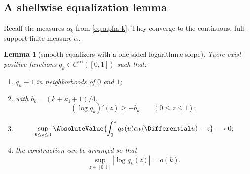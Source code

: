 \documentclass[11pt,oneside]{article}
\newtheorem{lemma}[theorem]{Lemma}
\theoremstyle{definition}
\theoremstyle{remark}
\begin{document}
\subsection{A shellwise equalization lemma}

Recall the measures \(\alpha_k\) from \eqref{eq:alpha-k}.  They converge to
the continuous, full-support finite measure \(\alpha\).

\begin{lemma}[smooth equalizers with a one-sided logarithmic slope]
\label{lem:equalizers}
There exist positive functions \(q_k\in C^\infty([0,1])\) such that:
\begin{enumerate}
\item \(q_k\equiv1\) in neighborhoods of \(0\) and \(1\);
\item with \(b_k=(k+\kappa_1+1)/4\),
\begin{equation}
 (\log q_k)'(z)\ge-b_k\qquad(0\le z\le1);
 \label{eq:q-slope}
\end{equation}
\item
\begin{equation}
 \sup_{0\le z\le1}
 \AbsoluteValue{\int_0^zq_k(u)\alpha_k(\Differential u)-z}
 \longrightarrow0;
 \label{eq:q-equalize}
\end{equation}
\item the construction can be arranged so that
\begin{equation}
 \sup_{z\in[0,1]}|\log q_k(z)|=o(k).
 \label{eq:q-sublinear}
\end{equation}
\end{enumerate}
\end{lemma}
\end{document}
